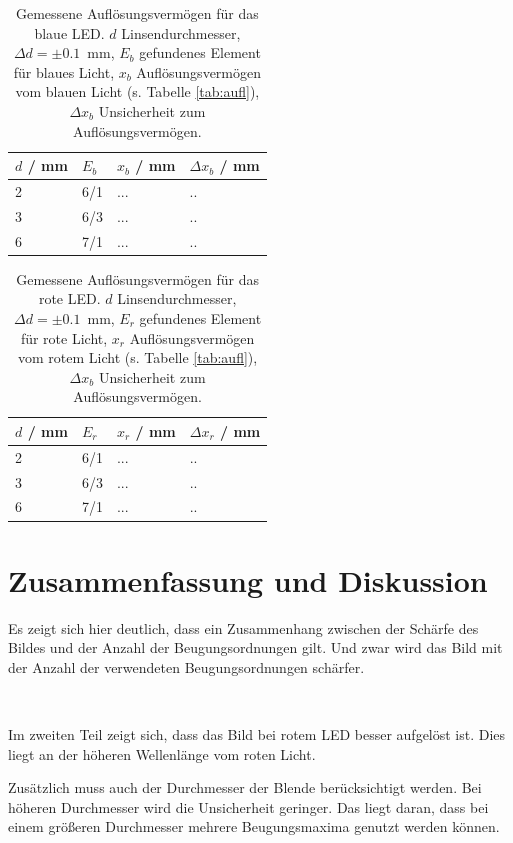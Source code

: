 \documentclass{article}
\begin{document}
\begin{table}[H]
\caption{Gemessene Auflösungsvermögen für das blaue LED. $d$ Linsendurchmesser, $\Delta d = \pm 0.1$~mm, $E_b$ gefundenes Element für blaues Licht, $x_b$ Auflösungsvermögen vom blauen Licht (s. Tabelle \ref{tab:aufl}), $\Delta x_b$ Unsicherheit zum Auflösungsvermögen.}

\begin{tabular}{llll}
$d$ / mm & $E_b$ & $x_b$ / mm & $\Delta x_b$ / mm \\
\hline
2 & 6/1 & ... & .. \\
3 & 6/3 & ... & .. \\
6 & 7/1 & ... & .. 
\end{tabular}
\end{table}


\begin{table}[H]
\caption{Gemessene Auflösungsvermögen für das rote LED. $d$ Linsendurchmesser, $\Delta d = \pm 0.1$~mm, $E_r$ gefundenes Element für rote Licht, $x_r$ Auflösungsvermögen vom rotem Licht (s. Tabelle \ref{tab:aufl}), $\Delta x_b$ Unsicherheit zum Auflösungsvermögen.}

\begin{tabular}{llll}
$d$ / mm & $E_r$ & $x_r$ / mm & $\Delta x_r$ / mm \\
\hline
2 & 6/1 & ... & .. \\
3 & 6/3 & ... & .. \\
6 & 7/1 & ... & .. 
\end{tabular}
\end{table}






\section{Zusammenfassung und Diskussion}

Es zeigt sich hier deutlich, dass ein Zusammenhang zwischen der Schärfe des Bildes und der Anzahl der Beugungsordnungen gilt. Und zwar wird das Bild mit der Anzahl der verwendeten Beugungsordnungen schärfer.

~

Im zweiten Teil zeigt sich, dass das Bild bei rotem LED besser aufgelöst ist. Dies liegt an der höheren Wellenlänge vom roten Licht.

Zusätzlich muss auch der Durchmesser der Blende berücksichtigt werden. Bei höheren Durchmesser wird die Unsicherheit geringer. Das liegt daran, dass bei einem größeren Durchmesser mehrere Beugungsmaxima genutzt werden können.
\end{document}
